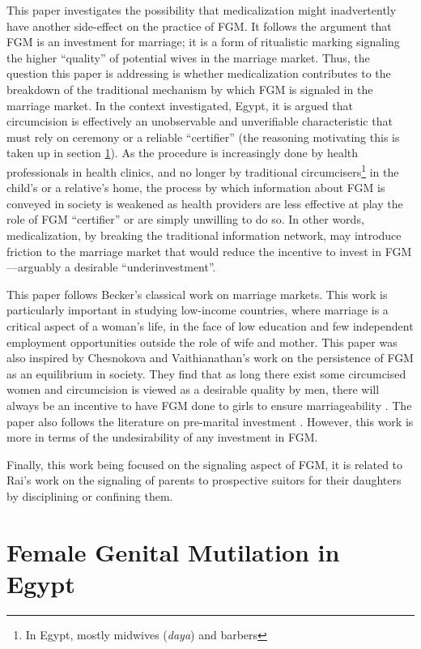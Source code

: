 \documentclass[12pt]{article}
\begin{document}
This paper investigates the possibility that medicalization might inadvertently have another side-effect on the practice of FGM.  It follows the argument that FGM is an investment for marriage; it is a form of ritualistic marking signaling the higher ``quality'' of potential wives in the marriage market. Thus, the question this paper is addressing is whether medicalization contributes to the breakdown of the traditional mechanism by which FGM is signaled in the marriage market.  In the context investigated, Egypt, it is argued that circumcision is effectively an unobservable and unverifiable characteristic that must rely on ceremony or a reliable ``certifier'' (the reasoning motivating this is taken up in section \ref{sec:fgmegypt}).  As the procedure is increasingly done by health professionals in health clinics, and no longer by traditional circumcisers\footnote{In Egypt, mostly midwives (\emph{daya}) and barbers} in the child's or a relative's home, the process by which information about FGM is conveyed in society is weakened as health providers are less effective at play the role of FGM ``certifier'' or are simply unwilling to do so. In other words, medicalization, by breaking the traditional information network, may introduce friction to the marriage market that would reduce the incentive to invest in FGM---arguably a desirable ``underinvestment''.

This paper follows Becker's \citeyearpar{Becker1981} classical work on marriage markets.  This work is particularly important in studying low-income countries, where marriage is a critical aspect of a woman's life, in the face of low education and few independent employment opportunities outside the role of wife and mother. This paper was also inspired by Chesnokova and Vaithianathan's \citeyearpar{Chesnokova2007} work on the persistence of FGM as an equilibrium in society. They find that as long there exist some circumcised women and circumcision is viewed as a desirable quality by men, there will always be an incentive to have FGM done to girls to ensure marriageability . The paper also follows the literature on pre-marital investment \citep{Burdett2001, Peters2002}.  However, this work is more in terms of the undesirability of any investment in FGM. 

Finally, this work being focused on the signaling aspect of FGM, it is related to Rai's \citeyearpar{Raia} work on the signaling of parents to prospective suitors for their daughters by disciplining or confining them. 

\section{Female Genital Mutilation in Egypt}\label{sec:fgmegypt}
\end{document}
